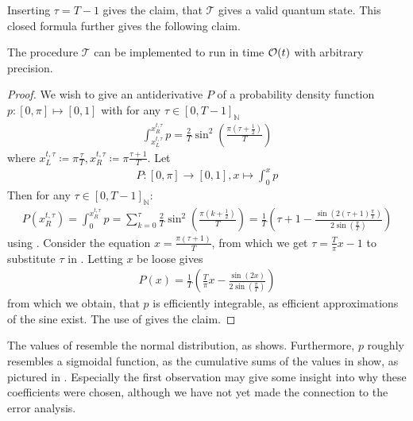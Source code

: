 Inserting \(\tau = T-1\) gives the claim, that \(\mathcal{T}\) gives a valid quantum state. This closed formula further gives the following claim.
\begin{theorem} \label{hhl_clock_initialization}
    The procedure \(\mathcal{T}\) can be implemented to run in time \(\operatorname{\mathcal{O}}(t)\) with arbitrary precision.
\end{theorem}
\begin{proof}
    We wish to give an antiderivative \(P\) of a probability density function \(p\colon [0, \pi] \mapsto [0, 1]\) with for any \(\tau \in [0, T-1]_{\mathbb{N}}\)
    \begin{align}
        \int_{x_L^{t, \tau}}^{x_R^{t, \tau}} p = \frac{2}{T} \sin^2\left(\frac{\pi(\tau + \frac{1}{2})}{T}\right) \label{initialization_probability_density_values}
    \end{align}
    where \(x_L^{t, \tau} \coloneqq \pi \frac{\tau}{T}, x_R^{t, \tau} \coloneqq \pi \frac{\tau+1}{T}\). Let
    \begin{align}
        P\colon [0, \pi] \to [0, 1], x \mapsto \int_0^x p
    \end{align}
    Then for any \(\tau \in [0, T-1]_{\mathbb{N}}\):
    \begin{align}
        P(x_R^{t, \tau}) = \int_0^{x_R^{t, \tau}} p = \sum_{k = 0}^{\tau} \frac{2}{T} \sin^2\left(\frac{\pi(k+\frac{1}{2})}{T}\right) = \frac{1}{T}\left(\tau + 1 - \frac{\sin\left(2(\tau+1)\frac{\pi}{T}\right)}{2\sin\left(\frac{\pi}{T}\right)}\right) \label{probability_integral_equation}
    \end{align}
    using . Consider the equation \(x = \frac{\pi(\tau + 1)}{T}\), from which we get \(\tau = \frac{T}{\pi}x-1\) to substitute \(\tau\) in . Letting \(x\) be loose gives
    \begin{align}
        P(x) = \frac{1}{T}\left(\frac{T}{\pi}x-\frac{\sin(2x)}{2\sin\left(\frac{\pi}{T}\right)}\right)
    \end{align}
    from which we obtain, that \(p\) is efficiently integrable, as efficient approximations of the sine exist. The use of  gives the claim.
\end{proof}

\begin{remark}
    The values of  resemble the normal distribution, as  shows. Furthermore, \(p\) roughly resembles a sigmoidal function, as the cumulative sums of the values in  show, as pictured in . Especially the first observation may give some insight into why these coefficients were chosen, although we have not yet made the connection to the error analysis.
\end{remark}

